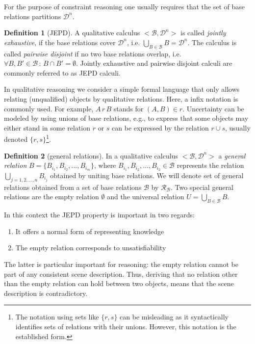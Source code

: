 \documentclass[headsepline]{scrreprt}
\theoremstyle{definition}
\newtheorem{defn}{Definition}
\begin{document}
For the purpose of constraint reasoning one usually requires that the set of base relations
partitions $\mathcal{D}^n$.

\begin{defn}[JEPD]
	A qualitative calculus $<\mathcal{B}, \mathcal{D}^n>$ is called {\em jointly exhaustive}, if the base relations cover $\mathcal{D}^n$, i.e. $\bigcup_{B\in \mathcal{B}} B = \mathcal{D}^n$. The calculus is called {\em pairwise disjoint} if no two base relations overlap, i.e. $\forall B,B' \in \mathcal{B} \, :\, B \cap B' = \emptyset$. Jointly exhaustive and pairwise disjoint calculi are commonly referred to as JEPD calculi.
\end{defn}


In qualitative reasoning we consider a simple formal language that only allows relating (unqualified) objects by qualitative relations. Here, a infix notation is commonly used. For example, $A\, r\, B$ stands for $(A,B) \in r$. Uncertainty can be modeled by using
unions of base relations, e.g., to express that some objects may either stand in some relation $r$ or $s$ can be expressed by the relation $r \cup s$, usually denoted $\{r,s\}$\footnote{The notation using sets like $\{r,s\}$ can be misleading as it syntactically identifies sets of relations with their unions. However, this notation is the established form.}.

\begin{defn}[general relations]
	In a qualitative calculus $<\mathcal{B}, \mathcal{D}^n>$ a {\em general relation} $B =\{ B_{i_{1}}, B_{i_{2}}, \ldots, B_{i_{m}}\}$, where  $B_{i_{1}}, B_{i_{2}}, \ldots, B_{i_{2}} \in \mathcal{B}$ represents the relation $\bigcup_{j=1,2,\ldots,n} B_{i_{j}}$ obtained by uniting base relations. We will denote set of general relations obtained from a set of base relations $\mathcal{B}$ by $\mathcal{R}_{\mathcal{B}}$.
	Two special general relations are the empty relation $\emptyset$ and the universal relation $U=\bigcup_{B\in \mathcal{B}} B$.
\end{defn}

In this context the JEPD property is important in two regards:
\begin{enumerate}
	\item It offers a normal form of representing knowledge
	\item The empty relation corresponds to unsatisfiability
\end{enumerate}

The latter is particular important for reasoning: the empty relation cannot be part of any consistent scene description. Thus, deriving that no relation other than the empty relation can hold between two objects, means that the scene description is contradictory.
\end{document}
